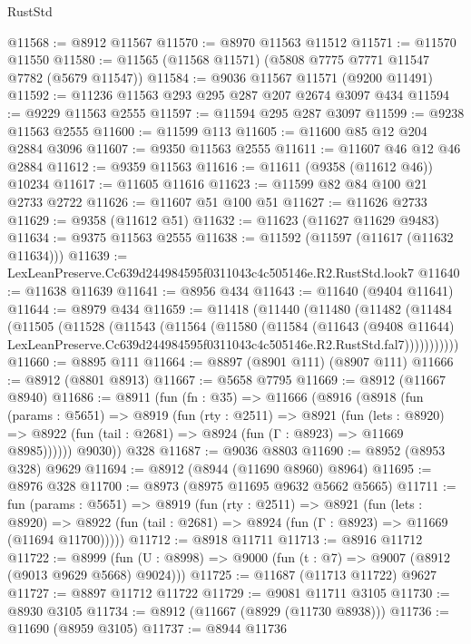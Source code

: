 \begin{lexlean}{RustStd}
\begin{coremodule}
@11568 := @8912 @11567
@11570 := @8970 @11563 @11512
@11571 := @11570 @11550
@11580 := @11565 (@11568 @11571) (@5808 @7775 @7771 @11547 @7782 (@5679 @11547))
@11584 := @9036 @11567 @11571 (@9200 @11491)
@11592 := @11236 @11563 @293 @295 @287 @207 @2674 @3097 @434
@11594 := @9229 @11563 @2555
@11597 := @11594 @295 @287 @3097
@11599 := @9238 @11563 @2555
@11600 := @11599 @113
@11605 := @11600 @85 @12 @204 @2884 @3096
@11607 := @9350 @11563 @2555
@11611 := @11607 @46 @12 @46 @2884
@11612 := @9359 @11563
@11616 := @11611 (@9358 (@11612 @46)) @10234
@11617 := @11605 @11616
@11623 := @11599 @82 @84 @100 @21 @2733 @2722
@11626 := @11607 @51 @100 @51
@11627 := @11626 @2733
@11629 := @9358 (@11612 @51)
@11632 := @11623 (@11627 @11629 @9483)
@11634 := @9375 @11563 @2555
@11638 := @11592 (@11597 (@11617 (@11632 @11634)))
@11639 := LexLeanPreserve.Cc639d244984595f0311043c4c505146e.R2.RustStd.look7
@11640 := @11638 @11639
@11641 := @8956 @434
@11643 := @11640 (@9404 @11641)
@11644 := @8979 @434
@11659 := @11418
    (@11440
      (@11480
        (@11482
          (@11484
            (@11505
              (@11528
                (@11543
                  (@11564
                    (@11580
                      (@11584
                        (@11643
                          (@9408 @11644)
                          LexLeanPreserve.Cc639d244984595f0311043c4c505146e.R2.RustStd.fal7)))))))))))
@11660 := @8895 @111
@11664 := @8897 (@8901 @111) (@8907 @111)
@11666 := @8912 (@8801 @8913)
@11667 := @5658 @7795
@11669 := @8912 (@11667 @8940)
@11686 := @8911
    (fun (fn : @35) =>
    @11666
      (@8916
        (@8918
          (fun (params : @5651) =>
          @8919
            (fun (rty : @2511) =>
            @8921
              (fun (lets : @8920) =>
              @8922 (fun (tail : @2681) => @8924 (fun (Γ : @8923) => @11669 @8985))))))
        @9030))
    @328
@11687 := @9036 @8803
@11690 := @8952 (@8953 @328) @9629
@11694 := @8912 (@8944 (@11690 @8960) @8964)
@11695 := @8976 @328
@11700 := @8973 (@8975 @11695 @9632 @5662 @5665)
@11711 := fun (params : @5651) =>
  @8919
    (fun (rty : @2511) =>
    @8921
      (fun (lets : @8920) =>
      @8922 (fun (tail : @2681) => @8924 (fun (Γ : @8923) => @11669 (@11694 @11700)))))
@11712 := @8918 @11711
@11713 := @8916 @11712
@11722 := @8999 (fun (U : @8998) => @9000 (fun (t : @7) => @9007 (@8912 (@9013 @9629 @5668) @9024)))
@11725 := @11687 (@11713 @11722) @9627
@11727 := @8897 @11712 @11722
@11729 := @9081 @11711 @3105
@11730 := @8930 @3105
@11734 := @8912 (@11667 (@8929 (@11730 @8938)))
@11736 := @11690 (@8959 @3105)
@11737 := @8944 @11736

\end{coremodule}
\end{lexlean}
